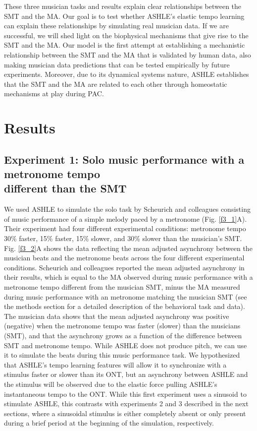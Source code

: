 \documentclass{report}
\begin{document}
These three musician tasks and results explain clear relationships between the SMT and the MA. Our goal is to test whether ASHLE's elastic tempo learning can explain these relationships by simulating real musician data. If we are successful, we will shed light on the biophysical mechanisms that give rise to the SMT and the MA. Our model is the first attempt at establishing a mechanistic relationship between the SMT and the MA that is validated by human data, also making musician data predictions that can be tested empirically by future experiments. Moreover, due to its dynamical systems nature, ASHLE establishes that the SMT and the MA are related to each other through homeostatic mechanisms at play during PAC.

\section{Results}

\subsection{Experiment 1: Solo music performance with a metronome tempo \\ different than the SMT}

We used ASHLE to simulate the solo task by Scheurich and colleagues \cite{scheurich2018tapping} consisting of music performance of a simple melody paced by a metronome (Fig.{} \ref{f3_1}A). Their experiment had four different experimental conditions: metronome tempo 30\% faster, 15\% faster, 15\% slower, and 30\% slower than the musician's SMT. Fig.{} \ref{f3_2}A shows the data reflecting the mean adjusted asynchrony between the musician beats and the metronome beats across the four different experimental conditions. Scheurich and colleagues \cite{scheurich2018tapping} reported the mean adjusted asynchrony in their results, which is equal to the MA observed during music performance with a metronome tempo different from the musician SMT, minus the MA measured during music performance with an metronome matching the musician SMT (see the methods section for a detailed description of the behavioral task and data). The musician data shows that the mean adjusted asynchrony was positive (negative) when the metronome tempo was faster (slower) than the musicians (SMT), and that the asynchrony grows as a function of the difference between SMT and metronome tempo. While ASHLE does not produce pitch, we can use it to simulate the beats during this music performance task. We hypothesized that ASHLE's tempo learning features will allow it to synchronize with a stimulus faster or slower than its ONT, but an asynchrony between ASHLE and the stimulus will be observed due to the elastic force pulling ASHLE's instantaneous tempo to the ONT. While this first experiment uses a sinusoid to stimulate ASHLE, this contrasts with experiments 2 and 3 described in the next sections, where a sinusoidal stimulus is either completely absent or only present during a brief period at the beginning of the simulation, respectively.
\end{document}
